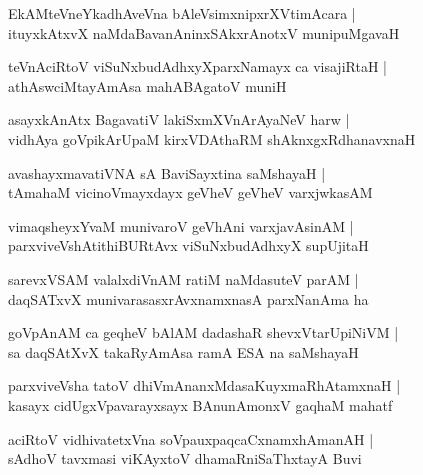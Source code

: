 \documentclass[twoside,12pt,openright]{book}
\newcounter{shloka}[chapter]
\begin{document}
\begin{shloka}%
EkAMteVneYkadhAveVna bAleVsimxnipxrXVtimAcara |\\
ituyxkAtxvX naMdaBavanAninxSAkxrAnotxV munipuMgavaH
\end{shloka}

\begin{shloka}%
teVnAciRtoV viSuNxbudAdhxyXparxNamayx ca visajiRtaH |\\
athAswciMtayAmAsa mahABAgatoV muniH
\end{shloka}

\begin{shloka}%
asayxkAnAtx BagavatiV lakiSxmXVnArAyaNeV harw |\\
vidhAya goVpikArUpaM kirxVDAthaRM shAknxgxRdhanavxnaH 
\end{shloka}

\begin{shloka}%
avashayxmavatiVNA sA BaviSayxtina saMshayaH |\\
tAmahaM vicinoVmayxdayx geVheV geVheV varxjwkasAM 
\end{shloka}

\begin{shloka}%
vimaqsheyxYvaM munivaroV geVhAni varxjavAsinAM |\\
parxviveVshAtithiBURtAvx viSuNxbudAdhxyX supUjitaH 
\end{shloka}

\begin{shloka}%
sarevxVSAM valalxdiVnAM ratiM naMdasuteV parAM |\\
daqSATxvX munivarasasxrAvxnamxnasA parxNanAma ha 
\end{shloka}

\begin{shloka}%
goVpAnAM ca geqheV bAlAM dadashaR shevxVtarUpiNiVM |\\
sa daqSAtXvX takaRyAmAsa ramA ESA na saMshayaH
\end{shloka}

\begin{shloka}%
parxviveVsha tatoV dhiVmAnanxMdasaKuyxmaRhAtamxnaH |\\
kasayx cidUgxVpavarayxsayx BAnunAmonxV gaqhaM mahatf 
\end{shloka}

\begin{shloka}%
aciRtoV vidhivatetxVna soVpauxpaqcaCxnamxhAmanAH |\\
sAdhoV tavxmasi viKAyxtoV dhamaRniSaThxtayA Buvi 
\end{shloka}
\end{document}
